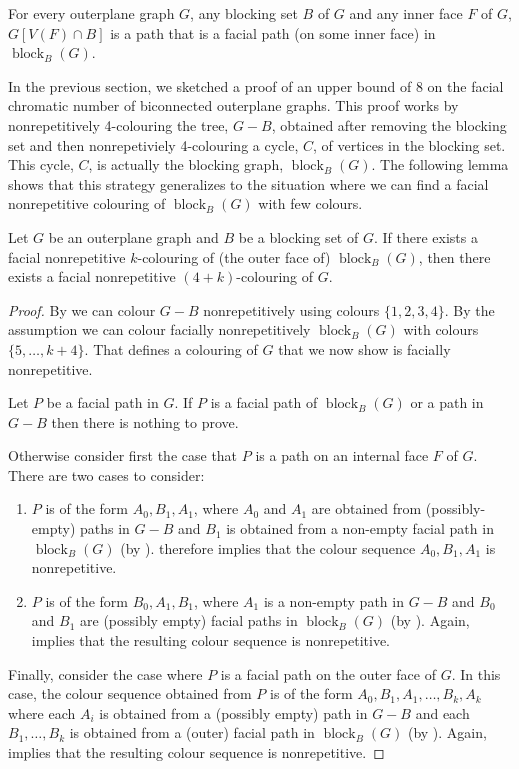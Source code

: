 \documentclass{patmorin}
\DeclareMathOperator{\block}{block}
\begin{document}
\begin{obs}
For every outerplane graph $G$, any blocking set $B$ of $G$ and any
inner face $F$ of $G$, $G[V(F)\cap B]$ is a path that is a facial path (on
some inner face)  in $\block_B(G)$.
\end{obs}

In the previous section, we sketched a proof of an upper bound of 8 on
the facial chromatic number of biconnected outerplane graphs.  This proof
works by nonrepetitively 4-colouring the tree, $G-B$, obtained after
removing the blocking set and then nonrepetiviely 4-colouring a cycle,
$C$, of vertices in the blocking set.  This cycle, $C$, is actually
the blocking graph, $\block_B(G)$.  The following lemma shows that
this strategy generalizes to the situation where we can find a facial
nonrepetitive colouring of $\block_B(G)$ with few colours.

\begin{lem}
  Let $G$ be an outerplane graph and $B$ be a blocking set of $G$. If
  there exists a facial nonrepetitive $k$-colouring of (the outer 
  face of) $\block_{B}(G)$, then there exists a facial nonrepetitive
  $(4+k)$-colouring of $G$.
\end{lem}

\begin{proof}
By  we can colour $G-B$ nonrepetitively using colours
$\{1,2,3,4\}$. By the assumption we can colour  facially
nonrepetitively $\block_{B}(G)$ with colours $\{5,\dots, k+4\}$. That
defines a colouring of $G$ that we now show is facially
nonrepetitive. 

Let $P$ be a facial path in $G$. If $P$ is a facial path of
$\block_{B}(G)$ or a path in $G-B$ then there is nothing to prove.

Otherwise consider first the case that $P$ is a path on an internal
face $F$ of $G$.   There are two cases to consider:
\begin{enumerate}
\item $P$ is of the form $A_0,B_1,A_1$, where $A_0$ and $A_1$ are obtained
from (possibly-empty) paths in $G-B$ and $B_1$ is obtained from a
non-empty facial path in $\block_B(G)$ (by ).   therefore
implies that the colour sequence $A_0,B_1,A_1$ is nonrepetitive.

\item $P$ is of the form $B_0,A_1,B_1$, where $A_1$ is a non-empty path
  in $G-B$ and $B_0$ and $B_1$ are (possibly empty) facial paths in
  $\block_B(G)$ (by ).
Again,  implies that the resulting colour sequence
is nonrepetitive.
\end{enumerate}

Finally, consider the case where $P$ is a facial path on the outer
face of $G$.  In this case, the colour sequence obtained from $P$ is
of the form $A_0,B_1,A_1,\ldots,B_k,A_k$ where each $A_i$ is obtained
from a (possibly empty) path in $G-B$ and each $B_1,\ldots,B_k$ is
obtained from a (outer) facial path in $\block_B(G)$ (by ). 
Again,  implies that the resulting colour sequence
is nonrepetitive.
\end{proof}
\end{document}
